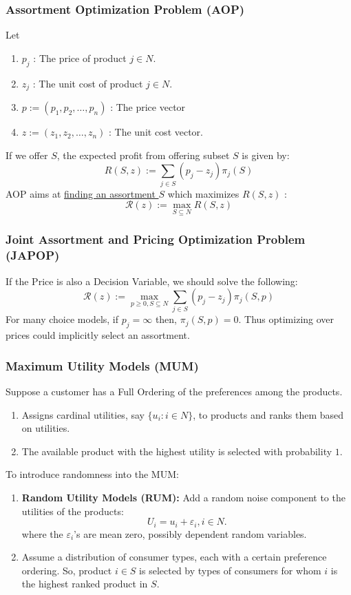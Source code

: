 \documentclass[11pt,a4paper]{article}
\begin{document}
\subsubsection{Assortment Optimization Problem (AOP)}
Let
\begin{enumerate}[$\bullet$]
    \item $p_{j}$ : The price of product $j \in N$.
    \item $z_{j}$ : The unit cost of product $j \in N$.
    \item $p:=\left(p_{1}, p_{2}, \ldots, p_{n}\right)$ : The price vector
    \item $z:=\left(z_{1}, z_{2}, \ldots, z_{n}\right)$ : The unit cost vector.
\end{enumerate}
If we offer $S$, the expected profit from offering subset $S$ is given by:
$$
R(S, z):=\sum_{j \in S}\left(p_{j}-z_{j}\right) \pi_{j}(S)
$$
AOP aims at \underline{finding an assortment $S$} which maximizes $R(S, z)$ :
$$
\mathcal{R}(z):=\max _{S \subseteq N} R(S, z)
$$

\subsubsection{Joint Assortment and Pricing Optimization Problem (JAPOP)}
If the Price is also a Decision Variable, we should solve the following:
$$
\mathcal{R}(z):=\max _{p \geq 0, S\subseteq N} \sum_{j \in S}\left(p_{j}-z_{j}\right) \pi_{j}(S, p)
$$
For many choice models, if $p_{j}=\infty$ then, $\pi_{j}(S, p)=0$. Thus optimizing over prices could implicitly select an assortment.

\subsubsection{Maximum Utility Models (MUM)}
Suppose a customer has a Full Ordering of the preferences among the products.
\begin{enumerate}[$\bullet$]
    \item Assigns cardinal utilities, say $\{u_i : i \in N\}$, to products and ranks them based on utilities.
    \item The available product with the highest utility is selected with probability $1$.
\end{enumerate}

To introduce randomness into the MUM:
\begin{enumerate}
    \item \textbf{Random Utility Models (RUM):} Add a random noise component to the utilities of the products: $$U_i =u_i +\varepsilon_i,i \in N.$$
    where the $\varepsilon_i$'s are mean zero, possibly dependent random variables.
    \item Assume a distribution of consumer types, each with a certain preference ordering. So, product $i\in S$ is selected by types of consumers for whom $i$ is the highest ranked product in $S$.
\end{enumerate}
\end{document}
